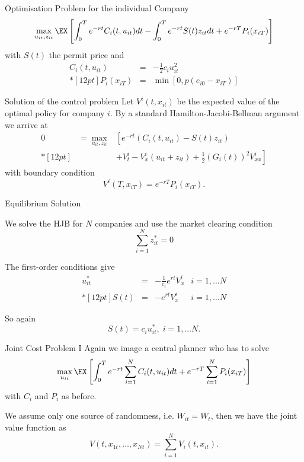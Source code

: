 


{Optimisation Problem for the individual Company}
\begin{equation}
\max_{u_{it}, z_{it}} \EX\left[\int_0^Te^{-rt}C_i(t,u_{it})dt - \int_0^T e^{-rt}S(t)z_{it}dt+ e^{-rT}P_i(x_{iT})\right]
\end{equation}
with $S(t)$ the permit price and
$$
\begin{array}{lll}
C_i(t,u_{it}) &=& - \frac{1}{2}c_i u_{it}^2 \\*[12pt]
P_i(x_{iT}) &=& \min[0,p(e_{i0}-x_{iT})]
\end{array}
$$

{Solution of the control problem}
Let $V^i(t,x_{it})$ be the expected value of the optimal policy for company $i$. By a standard
Hamilton-Jacobi-Bellman argument we arrive at
$$
\begin{array}{lll}
0&=\max_{u_{it},z_{it}}&\left[e^{-rt}(C_i(t,u_{it}) - S(t) z_{it})\right.\\*[12pt]
&&+\left.V^i_t -V_x^i(u_{it}+z_{it}) + \frac{1}{2}(G_i(t))^2 V^i_{xx}\right]
\end{array}
$$
with boundary condition
$$
V^i(T, x_{iT})=e^{-rT}P_i(x_{iT}).
$$

{Equilibrium Solution}




\item<1-> We solve the HJB for $N$ companies and use the market clearing condition
$$
\sum_{i=1}^N z_{it}^*=0
$$
\item<2-> The first-order conditions give
$$
\begin{array}{llll}
u_{it}^* &=& -\frac{1}{c_i} e^{rt} V^i_x & i=1, \ldots N \\*[12pt]
S(t) &=& - e^{rt} V^i_{x} & i=1, \ldots N
\end{array}
$$
\item<3-> So again
$$
S(t) = c_i u_{it}^*, \; i=1, \ldots N.
$$





{Joint Cost Problem I}
Again we image a central planner who has to solve
\begin{equation}
\max_{u_{it}} \EX\left[\int_0^Te^{-rt}\sum_{i=1}^N C_i(t,u_{it})dt + e^{-rT} \sum_{i=1}^N P_i(x_{iT})\right]
\end{equation}
with $C_i$ and $P_i$ as before.

We assume only one source of randomness, i.e. $W_{it}= W_t$, then we have the  joint value function as
$$
V(t, x_{1t}, \ldots, x_{Nt}) = \sum_{i=1}^N V_i(t,x_{it}).
$$

